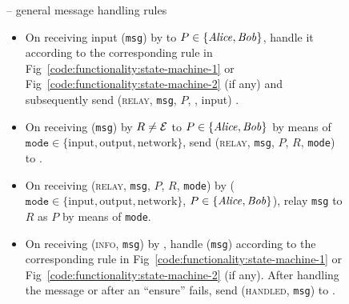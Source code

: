 
\begin{figure}[H]
  \begin{systembox}{\fchan{} -- general message handling rules}
    \begin{itemize}
      \item On receiving input (\texttt{msg}) by \environment to $P \in
      \{\mathit{Alice}, \mathit{Bob}\}$, handle it according to the corresponding rule in
      Fig~\ref{code:functionality:state-machine-1} or
      Fig~\ref{code:functionality:state-machine-2} (if any) and subsequently
      send (\textsc{relay}, \texttt{msg}, $P$, \environment, input) \adversary.
      \item On receiving (\texttt{msg}) by $R \neq \mathcal{E}$ to $P \in
      \{\mathit{Alice}, \mathit{Bob}\}$ by means of $\texttt{mode} \in \{\mathrm{input},
      \mathrm{output}, \mathrm{network}\}$, send (\textsc{relay}, \texttt{msg},
      $P$, $R$, \texttt{mode}) to \adversary.  
      \item On receiving (\textsc{relay}, \texttt{msg}, $P$, $R$, \texttt{mode})
      by \adversary ($\texttt{mode} \in \{\mathrm{input}, \mathrm{output},
      \mathrm{network}\}$, $P \in \{\mathit{Alice}, \mathit{Bob}\}$), relay \texttt{msg} to $R$
      as $P$ by means of \texttt{mode}. 
      \item On receiving (\textsc{info}, \texttt{msg}) by \adversary, handle
      (\texttt{msg}) according to the corresponding rule in
      Fig~\ref{code:functionality:state-machine-1} or
      Fig~\ref{code:functionality:state-machine-2} (if any). After handling the
      message or after an ``ensure'' fails, send (\textsc{handled},
      \texttt{msg}) to \adversary. 
    \end{itemize}
  \end{systembox}
  \caption{}
  \label{code:functionality:rules}
\end{figure}

